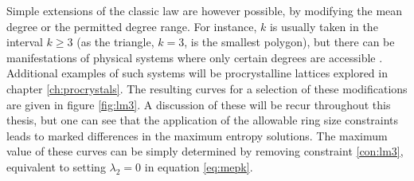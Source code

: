 Simple extensions of the classic law are however possible, by modifying the mean degree or the permitted degree range.
For instance, $k$ is usually taken in the interval $k\geq3$ (as the triangle, $k=3$, is the smallest polygon), but there can be manifestations of physical systems where only certain degrees are accessible \cite{Rivier1988}.
Additional examples of such systems will be procrystalline lattices explored in chapter \ref{ch:procrystals}. 
The resulting \lm{} curves for a selection of these modifications are given in figure \ref{fig:lm3}. 
A discussion of these will be recur throughout this thesis, but one can see that the application of the allowable ring size constraints leads to marked differences in the maximum entropy solutions.
The maximum value of these curves can be simply determined by removing constraint \eqref{con:lm3}, equivalent to setting $\lambda_2=0$ in equation \eqref{eq:mepk}.


